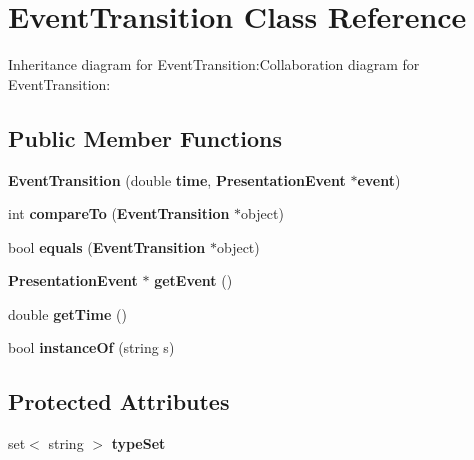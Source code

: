 \section{EventTransition Class Reference}
\label{classbr_1_1pucrio_1_1telemidia_1_1ginga_1_1ncl_1_1model_1_1event_1_1transition_1_1EventTransition}
Inheritance diagram for EventTransition:Collaboration diagram for EventTransition:\subsection*{Public Member Functions}
\begin{CompactItemize}
\item 
\textbf{EventTransition} (double {\bf time}, {\bf PresentationEvent} $\ast${\bf event})\label{classbr_1_1pucrio_1_1telemidia_1_1ginga_1_1ncl_1_1model_1_1event_1_1transition_1_1EventTransition_f15fbff95685633cf29f4257784c946b}

\item 
int \textbf{compareTo} ({\bf EventTransition} $\ast$object)\label{classbr_1_1pucrio_1_1telemidia_1_1ginga_1_1ncl_1_1model_1_1event_1_1transition_1_1EventTransition_ddb5cfc34a449b7bebf2a728818003b8}

\item 
bool \textbf{equals} ({\bf EventTransition} $\ast$object)\label{classbr_1_1pucrio_1_1telemidia_1_1ginga_1_1ncl_1_1model_1_1event_1_1transition_1_1EventTransition_ba56a1280d10a69e2406f03df4e0e990}

\item 
{\bf PresentationEvent} $\ast$ \textbf{getEvent} ()\label{classbr_1_1pucrio_1_1telemidia_1_1ginga_1_1ncl_1_1model_1_1event_1_1transition_1_1EventTransition_043ce0bb1830bcbb7b3c9d04694331b3}

\item 
double \textbf{getTime} ()\label{classbr_1_1pucrio_1_1telemidia_1_1ginga_1_1ncl_1_1model_1_1event_1_1transition_1_1EventTransition_4437edd7fd2832790c13ba3179bcc64d}

\item 
bool \textbf{instanceOf} (string s)\label{classbr_1_1pucrio_1_1telemidia_1_1ginga_1_1ncl_1_1model_1_1event_1_1transition_1_1EventTransition_4081cb1ebb5adebc1d0858ff6f69af0d}

\end{CompactItemize}
\subsection*{Protected Attributes}
\begin{CompactItemize}
\item 
set$<$ string $>$ {\bf typeSet}\label{classbr_1_1pucrio_1_1telemidia_1_1ginga_1_1ncl_1_1model_1_1event_1_1transition_1_1EventTransition_145b3afaa194308141d367cc1393d565}

\end{CompactItemize}
